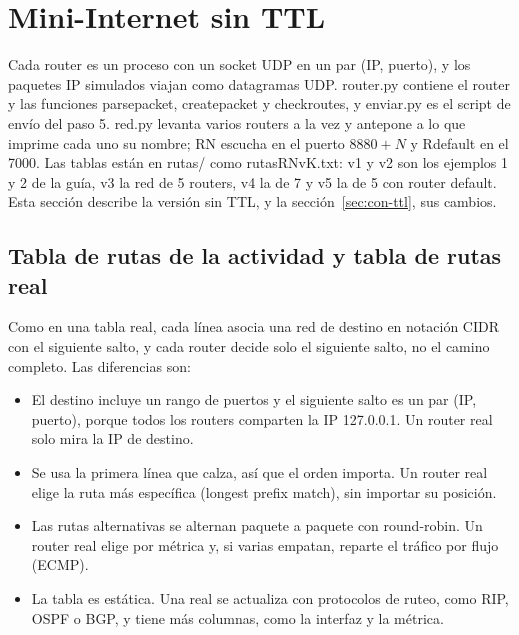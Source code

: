 \documentclass[
	spanish, %
	letterpaper, oneside
]{article}
\newcommand{\codeunderscore}{\textunderscore\allowbreak}
\newcommand{\code}[1]{{\let\_\codeunderscore#1}}     %
\begin{document}
\templatePortrait

\templatePagecfg

\templateIndex

\templateFinalcfg


\section{Mini-Internet sin TTL}
Cada router es un proceso con un socket UDP en un par (IP, puerto), y los paquetes IP simulados viajan como datagramas UDP. \code{router.py} contiene el router y las funciones \code{parse\_packet}, \code{create\_packet} y \code{check\_routes}, y \code{enviar.py} es el script de envío del paso 5. \code{red.py} levanta varios routers a la vez y antepone a lo que imprime cada uno su nombre; RN escucha en el puerto $8880 + N$ y Rdefault en el 7000. Las tablas están en \code{rutas/} como \code{rutas\_RN\_vK.txt}: v1 y v2 son los ejemplos 1 y 2 de la guía, v3 la red de 5 routers, v4 la de 7 y v5 la de 5 con router default. Esta sección describe la versión sin TTL, y la sección~\ref{sec:con-ttl}, sus cambios.

\subsection{Tabla de rutas de la actividad y tabla de rutas real}
Como en una tabla real, cada línea asocia una red de destino en notación CIDR con el siguiente salto, y cada router decide solo el siguiente salto, no el camino completo. Las diferencias son:
\begin{itemize}
	\item El destino incluye un rango de puertos y el siguiente salto es un par (IP, puerto), porque todos los routers comparten la IP 127.0.0.1. Un router real solo mira la IP de destino.
	\item Se usa la primera línea que calza, así que el orden importa. Un router real elige la ruta más específica (longest prefix match), sin importar su posición.
	\item Las rutas alternativas se alternan paquete a paquete con round-robin. Un router real elige por métrica y, si varias empatan, reparte el tráfico por flujo (ECMP).
	\item La tabla es estática. Una real se actualiza con protocolos de ruteo, como RIP, OSPF o BGP, y tiene más columnas, como la interfaz y la métrica.
\end{itemize}
\end{document}

